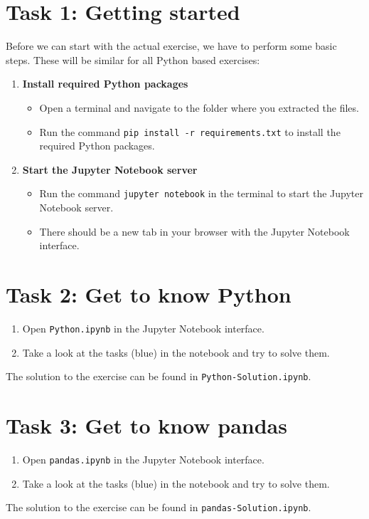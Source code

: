 \documentclass[
english,
smallborders
]{../i6prcsht}
\begin{document}
\section*{Task 1: Getting started}

Before we can start with the actual exercise, we have to perform some basic steps. These will be similar for all Python based exercises:

\begin{enumerate}
	\item \textbf{Install required Python packages}

	      \begin{itemize}
		      \item Open a terminal and navigate to the folder where you extracted the files.
		      \item Run the command \texttt{pip install -r requirements.txt} to install the required Python packages.
	      \end{itemize}

	\item \textbf{Start the Jupyter Notebook server}

	      \begin{itemize}
		      \item Run the command \texttt{jupyter notebook} in the terminal to start the Jupyter Notebook server.
		      \item There should be a new tab in your browser with the Jupyter Notebook interface.
	      \end{itemize}
\end{enumerate}

\section*{Task 2: Get to know Python}

\begin{enumerate}
	\item Open \texttt{Python.ipynb} in the Jupyter Notebook interface.
	\item Take a look at the tasks (blue) in the notebook and try to solve them.
\end{enumerate}

\begin{solution}
	The solution to the exercise can be found in \texttt{Python-Solution.ipynb}.
\end{solution}

\section*{Task 3: Get to know pandas}

\begin{enumerate}
	\item Open \texttt{pandas.ipynb} in the Jupyter Notebook interface.
	\item Take a look at the tasks (blue) in the notebook and try to solve them.
\end{enumerate}

\begin{solution}
	The solution to the exercise can be found in \texttt{pandas-Solution.ipynb}.
\end{solution}
\end{document}
